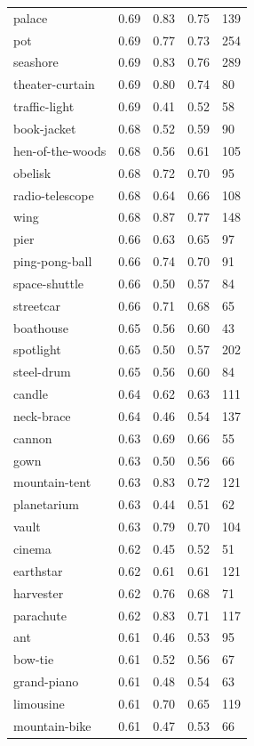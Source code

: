 \begin{center}
\begin{longtable}{lllll}
palace & 0.69 & 0.83 & 0.75 & 139 \\
pot & 0.69 & 0.77 & 0.73 & 254 \\
seashore & 0.69 & 0.83 & 0.76 & 289 \\
theater-curtain & 0.69 & 0.80 & 0.74 & 80 \\
traffic-light & 0.69 & 0.41 & 0.52 & 58 \\
book-jacket & 0.68 & 0.52 & 0.59 & 90 \\
hen-of-the-woods & 0.68 & 0.56 & 0.61 & 105 \\
obelisk & 0.68 & 0.72 & 0.70 & 95 \\
radio-telescope & 0.68 & 0.64 & 0.66 & 108 \\
wing & 0.68 & 0.87 & 0.77 & 148 \\
pier & 0.66 & 0.63 & 0.65 & 97 \\
ping-pong-ball & 0.66 & 0.74 & 0.70 & 91 \\
space-shuttle & 0.66 & 0.50 & 0.57 & 84 \\
streetcar & 0.66 & 0.71 & 0.68 & 65 \\
boathouse & 0.65 & 0.56 & 0.60 & 43 \\
spotlight & 0.65 & 0.50 & 0.57 & 202 \\
steel-drum & 0.65 & 0.56 & 0.60 & 84 \\
candle & 0.64 & 0.62 & 0.63 & 111 \\
neck-brace & 0.64 & 0.46 & 0.54 & 137 \\
cannon & 0.63 & 0.69 & 0.66 & 55 \\
gown & 0.63 & 0.50 & 0.56 & 66 \\
mountain-tent & 0.63 & 0.83 & 0.72 & 121 \\
planetarium & 0.63 & 0.44 & 0.51 & 62 \\
vault & 0.63 & 0.79 & 0.70 & 104 \\
cinema & 0.62 & 0.45 & 0.52 & 51 \\
earthstar & 0.62 & 0.61 & 0.61 & 121 \\
harvester & 0.62 & 0.76 & 0.68 & 71 \\
parachute & 0.62 & 0.83 & 0.71 & 117 \\
ant & 0.61 & 0.46 & 0.53 & 95 \\
bow-tie & 0.61 & 0.52 & 0.56 & 67 \\
grand-piano & 0.61 & 0.48 & 0.54 & 63 \\
limousine & 0.61 & 0.70 & 0.65 & 119 \\
mountain-bike & 0.61 & 0.47 & 0.53 & 66 \\

\end{longtable}
\end{center}

